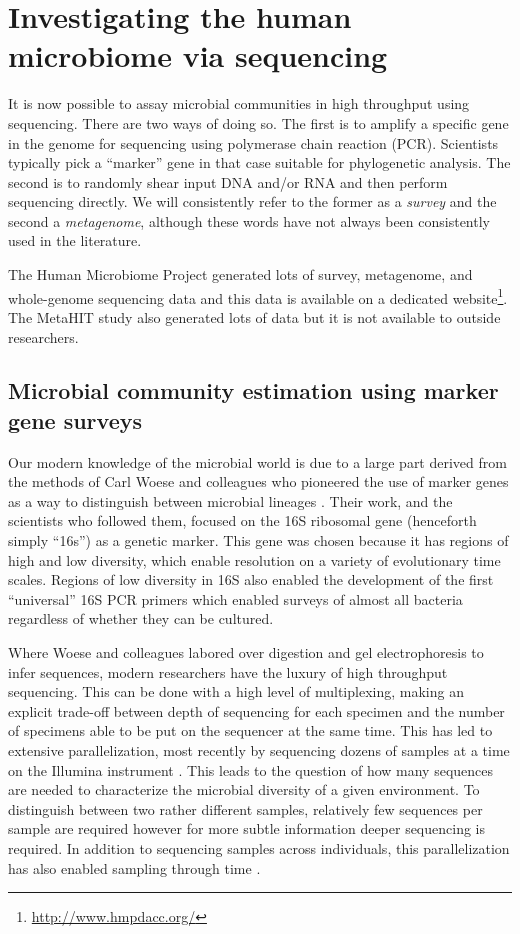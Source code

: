 \documentclass{amsart}
\begin{document}
\section{Investigating the human microbiome via sequencing}
It is now possible to assay microbial communities in high throughput using sequencing.
There are two ways of doing so.
The first is to amplify a specific gene in the genome for sequencing using polymerase chain reaction (PCR).
Scientists typically pick a ``marker'' gene in that case suitable for phylogenetic analysis.
The second is to randomly shear input DNA and/or RNA and then perform sequencing directly.
We will consistently refer to the former as a \textit{survey} and the second a \textit{metagenome}, although these words have not always been consistently used in the literature.

The Human Microbiome Project \citep{methe2012framework} generated lots of survey, metagenome, and whole-genome sequencing data and this data is available on a dedicated website\footnote{\url{http://www.hmpdacc.org/}}.
The MetaHIT study \citep{qin2010human} also generated lots of data but it is not available to outside researchers.

\subsection{Microbial community estimation using marker gene surveys}
Our modern knowledge of the microbial world is due to a large part derived from the methods of Carl Woese and colleagues who pioneered the use of marker genes as a way to distinguish between microbial lineages \citep{fox1977comparative}.
Their work, and the scientists who followed them, focused on the 16S ribosomal gene (henceforth simply ``16s'') as a genetic marker.
This gene was chosen because it has regions of high and low diversity, which enable resolution on a variety of evolutionary time scales.
Regions of low diversity in 16S also enabled the development of the first ``universal'' 16S PCR primers \citep{lane1985rapid} which enabled surveys of almost all bacteria regardless of whether they can be cultured.

Where Woese and colleagues labored over digestion and gel electrophoresis to infer sequences, modern researchers have the luxury of high throughput sequencing.
This can be done with a high level of multiplexing, making an explicit trade-off between depth of sequencing for each specimen and the number of specimens able to be put on the sequencer at the same time.
This has led to extensive parallelization, most recently by sequencing dozens of samples at a time on the Illumina instrument \citep{degnan2011illumina,caporaso2012ultra}.
This leads to the question of how many sequences are needed to characterize the microbial diversity of a given environment.
To distinguish between two rather different samples, relatively few sequences per sample are required \citep{kuczynski2010microbial} however for more subtle information deeper sequencing is required.
In addition to sequencing samples across individuals, this parallelization has also enabled sampling through time \citep[e.g.][]{caporaso2011moving}.
\end{document}

